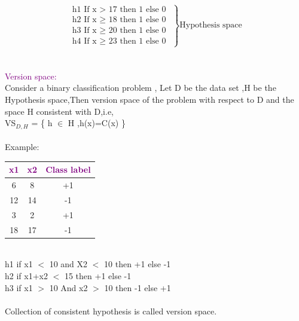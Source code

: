 $$
 \left.
    \begin{array}{ll}
  \mbox{h1 If  x  $>$ 17 then 1 else 0 }        \\
  \mbox{h2  If  x $\geq$ 18 then 1 else 0 }     \\
  \mbox{h3 If  x $\geq$  20 then 1 else 0}      \\
  \mbox{h4 If  x  $\geq$ 23 then 1 else 0}
  \end{array}
\right \}\mbox{Hypothesis space}
$$
\\
\\
{\textcolor{purple}{Version space:}}
\\
Consider a binary classification problem ,
Let D be the data set ,H be the Hypothesis space,Then version space of the problem with respect to D and the space H consistent with D,i.e,\\
VS$_{D,H}$ = \{ h $\in$  H ,h(x)=C(x) \}\\
\\
Example:
 \begin{table}[h]                           
 \centering
    \begin{tabular}{|c|c|c|}
    \hline
  \textcolor{purple}{x1}    &  \textcolor{purple}{x2} &    \textcolor{purple}{Class label}            \\ \hline
  6      &   8    & +1         \\ \hline          
     12    &  14  & -1 \\ \hline
      3   &   2   & +1      \\ \hline
     18    &   17 & -1        \\ \hline

    \end{tabular}
    \label{tab:msg1}                            

\end{table}\\

h1 if  x1 $<$ 10 and X2 $<$ 10  then +1 else -1\\
h2 if x1+x2 $<$ 15 then +1 else -1\\
h3 if x1 $>$ 10 And  x2 $>$ 10 then -1 else +1\\
\\
Collection of consistent hypothesis is called version space.